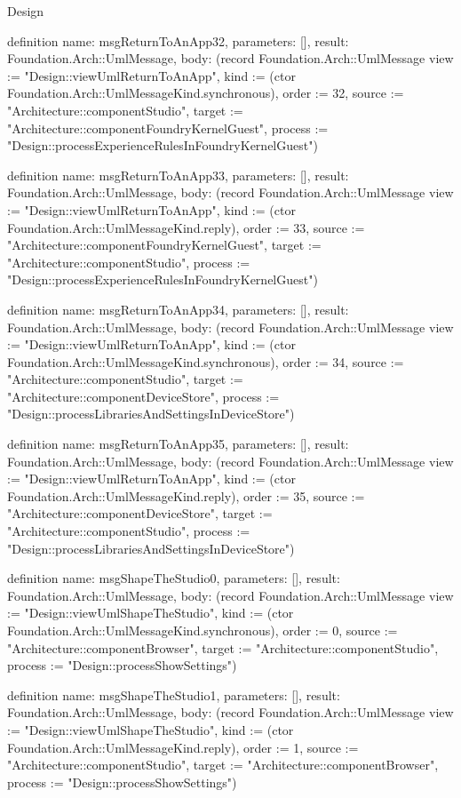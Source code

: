 \begin{lexlean}{Design}
\begin{semanticmodule}
definition{
  name: msgReturnToAnApp32,
  parameters: [],
  result: Foundation.Arch::UmlMessage,
  body: (record Foundation.Arch::UmlMessage {view := "Design::viewUmlReturnToAnApp", kind := (ctor Foundation.Arch::UmlMessageKind.synchronous), order := 32, source := "Architecture::componentStudio", target := "Architecture::componentFoundryKernelGuest", process := "Design::processExperienceRulesInFoundryKernelGuest"})
}

definition{
  name: msgReturnToAnApp33,
  parameters: [],
  result: Foundation.Arch::UmlMessage,
  body: (record Foundation.Arch::UmlMessage {view := "Design::viewUmlReturnToAnApp", kind := (ctor Foundation.Arch::UmlMessageKind.reply), order := 33, source := "Architecture::componentFoundryKernelGuest", target := "Architecture::componentStudio", process := "Design::processExperienceRulesInFoundryKernelGuest"})
}

definition{
  name: msgReturnToAnApp34,
  parameters: [],
  result: Foundation.Arch::UmlMessage,
  body: (record Foundation.Arch::UmlMessage {view := "Design::viewUmlReturnToAnApp", kind := (ctor Foundation.Arch::UmlMessageKind.synchronous), order := 34, source := "Architecture::componentStudio", target := "Architecture::componentDeviceStore", process := "Design::processLibrariesAndSettingsInDeviceStore"})
}

definition{
  name: msgReturnToAnApp35,
  parameters: [],
  result: Foundation.Arch::UmlMessage,
  body: (record Foundation.Arch::UmlMessage {view := "Design::viewUmlReturnToAnApp", kind := (ctor Foundation.Arch::UmlMessageKind.reply), order := 35, source := "Architecture::componentDeviceStore", target := "Architecture::componentStudio", process := "Design::processLibrariesAndSettingsInDeviceStore"})
}

definition{
  name: msgShapeTheStudio0,
  parameters: [],
  result: Foundation.Arch::UmlMessage,
  body: (record Foundation.Arch::UmlMessage {view := "Design::viewUmlShapeTheStudio", kind := (ctor Foundation.Arch::UmlMessageKind.synchronous), order := 0, source := "Architecture::componentBrowser", target := "Architecture::componentStudio", process := "Design::processShowSettings"})
}

definition{
  name: msgShapeTheStudio1,
  parameters: [],
  result: Foundation.Arch::UmlMessage,
  body: (record Foundation.Arch::UmlMessage {view := "Design::viewUmlShapeTheStudio", kind := (ctor Foundation.Arch::UmlMessageKind.reply), order := 1, source := "Architecture::componentStudio", target := "Architecture::componentBrowser", process := "Design::processShowSettings"})
}


\end{semanticmodule}
\end{lexlean}
